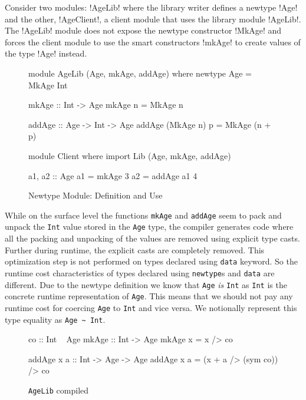 \documentclass[manuscript,screen,nonacm]{acmart}
\begin{document}
Consider two modules: !AgeLib! where the library writer defines a newtype !Age! and the other, !AgeClient!, a client module that uses the library module !AgeLib!. The !AgeLib! module does not expose the newtype constructor !MkAge! and forces the client module to use the smart constructors !mkAge! to create values of the type !Age! instead.

\begin{figure}[ht]
  \centering
  \begin{minipage}[ht]{0.5\linewidth}
    \begin{code}
      module AgeLib (Age, mkAge, addAge) where
      newtype Age = MkAge Int
      
      mkAge :: Int -> Age
      mkAge n = MkAge n

      addAge :: Age -> Int -> Age
      addAge (MkAge n) p = MkAge (n + p)
    \end{code}
  \end{minipage}%
  \begin{minipage}[ht]{0.4\linewidth}
    \begin{code}
      module Client where
      import Lib (Age, mkAge, addAge)

      a1, a2 :: Age
      a1 = mkAge 3
      a2 = addAge a1 4


    \end{code}
  \end{minipage}
  \caption{Newtype Module: Definition and Use}
  \label{fig:newtype-modules}
\end{figure}
While on the surface level the functions \lstinline{mkAge} and \lstinline{addAge} seem to pack and unpack
the \lstinline{Int} value stored in the \lstinline{Age} type, the compiler generates code where all the packing and unpacking of the values are removed using explicit type casts. Further during runtime, the explicit casts are completely removed. This optimization step is not performed on types declared using \lstinline{data} keyword. So the runtime cost characteristics of types declared using  \lstinline{newtype}s and \lstinline{data} are different. Due to the newtype definition
we know that \lstinline{Age} \emph{is} \lstinline{Int} as \lstinline{Int} is the concrete runtime representation of \lstinline{Age}. This means that we should not pay any runtime cost for coercing \lstinline{Age} to \lstinline{Int} and vice versa. We notionally represent this type equality as \lstinline{Age ~ Int}.
\begin{figure}[ht]
  \centering
  \begin{minipage}[h]{0.4\linewidth}
    \begin{code}
      co :: Int ~ Age
      mkAge :: Int -> Age
      mkAge x = x /> co
    \end{code}
  \end{minipage}%
  \begin{minipage}[ht]{0.4\linewidth}
    \begin{code}
      addAge x a :: Int -> Age -> Age
      addAge x a = (x + a /> (sym co)) /> co
    \end{code}
  \end{minipage}
  \caption{\lstinline{AgeLib} compiled}
  \label{fig:compiled-code}
\end{figure}
\end{document}
